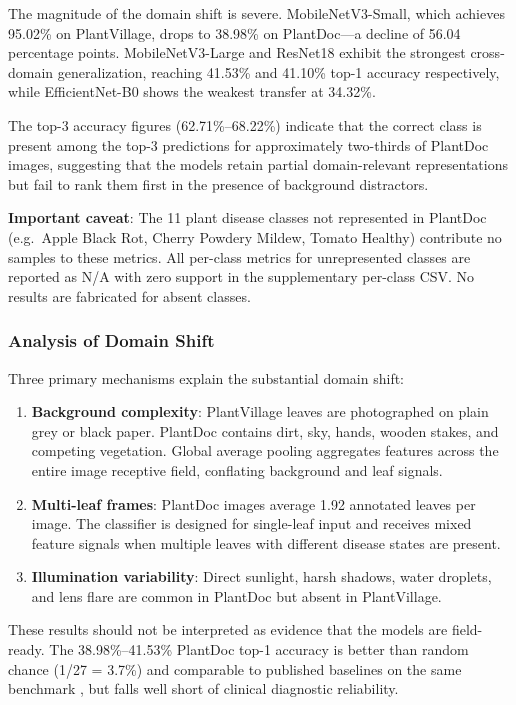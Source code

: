 \documentclass[pdflatex,sn-mathphys-num]{sn-jnl}
\theoremstyle{thmstyleone}%
\theoremstyle{thmstyletwo}%
\theoremstyle{thmstylethree}%
\begin{document}
The magnitude of the domain shift is severe. MobileNetV3-Small, which achieves 95.02\%
on PlantVillage, drops to 38.98\% on PlantDoc---a decline of 56.04 percentage points.
MobileNetV3-Large and ResNet18 exhibit the strongest cross-domain generalization,
reaching 41.53\% and 41.10\% top-1 accuracy respectively, while EfficientNet-B0
shows the weakest transfer at 34.32\%.

The top-3 accuracy figures (62.71\%--68.22\%) indicate that the correct class is
present among the top-3 predictions for approximately two-thirds of PlantDoc images,
suggesting that the models retain partial domain-relevant representations but fail to
rank them first in the presence of background distractors.

\textbf{Important caveat}: The 11 plant disease classes not represented in PlantDoc
(e.g.\ Apple Black Rot, Cherry Powdery Mildew, Tomato Healthy) contribute no samples
to these metrics. All per-class metrics for unrepresented classes are reported as N/A
with zero support in the supplementary per-class CSV. No results are fabricated for
absent classes.

\subsubsection{Analysis of Domain Shift}

Three primary mechanisms explain the substantial domain shift:
\begin{enumerate}
  \item \textbf{Background complexity}: PlantVillage leaves are photographed on plain
        grey or black paper. PlantDoc contains dirt, sky, hands, wooden stakes, and
        competing vegetation. Global average pooling aggregates features across the
        entire image receptive field, conflating background and leaf signals.
  \item \textbf{Multi-leaf frames}: PlantDoc images average 1.92 annotated leaves per
        image. The classifier is designed for single-leaf input and receives mixed
        feature signals when multiple leaves with different disease states are present.
  \item \textbf{Illumination variability}: Direct sunlight, harsh shadows, water
        droplets, and lens flare are common in PlantDoc but absent in PlantVillage.
\end{enumerate}

These results should not be interpreted as evidence that the models are field-ready.
The 38.98\%--41.53\% PlantDoc top-1 accuracy is better than random chance (1/27 = 3.7\%)
and comparable to published baselines on the same benchmark
\citep{singh2020plant,dsouza2023generalization}, but falls well short of clinical
diagnostic reliability.
\end{document}

